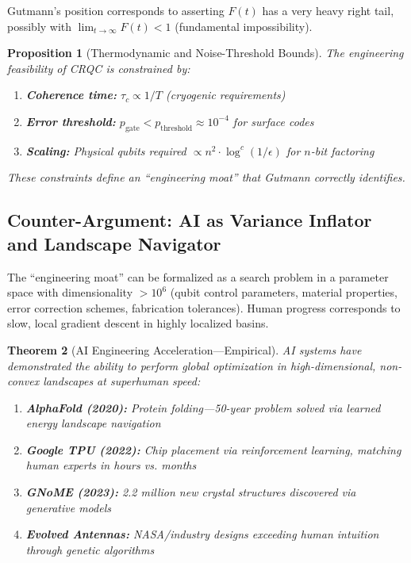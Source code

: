 \documentclass[11pt,a4paper]{article}
\newtheorem{theorem}{Theorem}[section]
\newtheorem{proposition}[theorem]{Proposition}
\begin{document}
Gutmann's position corresponds to asserting $F(t)$ has a very heavy right tail, possibly with $\lim_{t \to \infty} F(t) < 1$ (fundamental impossibility).

\begin{proposition}[Thermodynamic and Noise-Threshold Bounds]
The engineering feasibility of CRQC is constrained by:
\begin{enumerate}[noitemsep]
    \item \textbf{Coherence time:} $\tau_c \propto 1/T$ (cryogenic requirements)
    \item \textbf{Error threshold:} $p_{\text{gate}} < p_{\text{threshold}} \approx 10^{-4}$ for surface codes
    \item \textbf{Scaling:} Physical qubits required $\propto n^2 \cdot \log^c(1/\epsilon)$ for $n$-bit factoring
\end{enumerate}
These constraints define an ``engineering moat'' that Gutmann correctly identifies.
\end{proposition}

\subsection{Counter-Argument: AI as Variance Inflator and Landscape Navigator}

The ``engineering moat'' can be formalized as a search problem in a parameter space with dimensionality $>10^6$ (qubit control parameters, material properties, error correction schemes, fabrication tolerances). Human progress corresponds to slow, local gradient descent in highly localized basins.

\begin{theorem}[AI Engineering Acceleration---Empirical]
AI systems have demonstrated the ability to perform global optimization in high-dimensional, non-convex landscapes at superhuman speed:
\begin{enumerate}[noitemsep]
    \item \textbf{AlphaFold (2020):} Protein folding---50-year problem solved via learned energy landscape navigation
    \item \textbf{Google TPU (2022):} Chip placement via reinforcement learning, matching human experts in hours vs. months
    \item \textbf{GNoME (2023):} 2.2 million new crystal structures discovered via generative models
    \item \textbf{Evolved Antennas:} NASA/industry designs exceeding human intuition through genetic algorithms
\end{enumerate}
\end{theorem}
\end{document}

